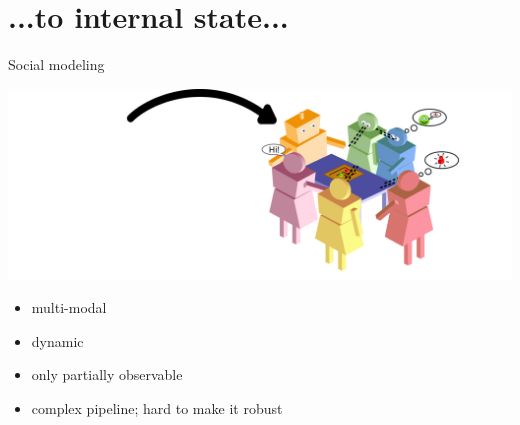 \documentclass[xcolor=table]{beamer}
\begin{document}
\section[Internal state]{...to internal state...}

{

\begin{frame}{Social modeling}
    \begin{center}
        \includegraphics[width=0.95\linewidth]{figs/social-interactions/social-complexity}
    \end{center}

     {
        \begin{itemize}
            \item multi-modal
            \item dynamic
            \item only partially observable
            \item complex pipeline; hard to make it robust
        \end{itemize}
    }

\end{frame}
}




\end{document}
